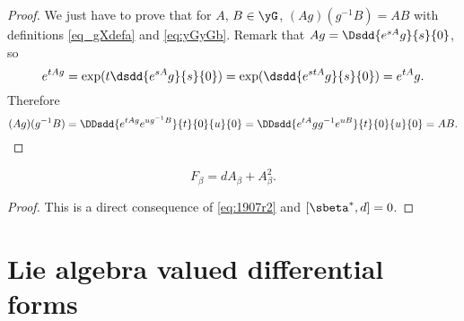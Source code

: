 \begin{proof}
	We just have to prove that for $A$, $B\in\yG$, $(Ag)(g^{-1} B)=AB$ with definitions \eqref{eq_gXdefa} and \eqref{eq:yGyGb}. Remark that $Ag=\Dsdd{e^{sA}g}{s}{0}$, so
	\[
		e^{tAg}=\exp(t\dsdd{e^{sA}g}{s}{0})=\exp(\dsdd{e^{stA}g}{s}{0})=e^{tA}g.
	\]
	Therefore
	\[
		(Ag)(g^{-1} B)=\DDsdd{  e^{tAg}e^{ug^{-1} B}  }{t}{0}{u}{0}=\DDsdd{  e^{tA}gg^{-1} e^{uB}  }{t}{0}{u}{0}=AB.
	\]
\end{proof}

\begin{lemma}
	\begin{equation}
		F_{\beta}=dA_{\beta}+A_{\beta}^2.
	\end{equation}
\end{lemma}

\begin{proof}
	This is  a direct consequence of \eqref{eq:1907r2} and $[\sbeta^*,d]=0$.
\end{proof}

\section{Lie algebra valued differential forms}	\label{SecLiaAlgformval}

